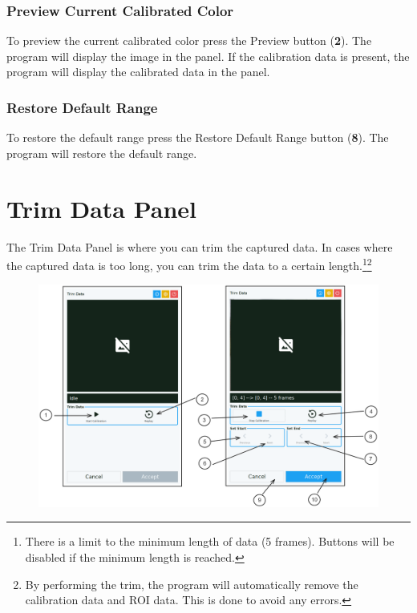 \subsubsection{Preview Current Calibrated Color}

To preview the current calibrated color press the Preview button (\textbf{2}). The program will display the image in the panel. If the calibration data is present, the program will display the calibrated data in the panel.

\subsubsection{Restore Default Range}

To restore the default range press the Restore Default Range button (\textbf{8}). The program will restore the default range.


\pagebreak
\section{Trim Data Panel}
\label{sec:trim-data-panel}

The Trim Data Panel is where you can trim the captured data. In cases where the captured data is too long, you can trim the data to a certain length.\footnote{There is a limit to the minimum length of data (5 frames). Buttons will be disabled if the minimum length is reached.}\footnote{By performing the trim, the program will automatically remove the calibration data and ROI data. This is done to avoid any errors.}

\begin{figure}[H]
    \centering
    \includegraphics[width=\textwidth]{texs/chapter1/image/p7.png}
\end{figure}

